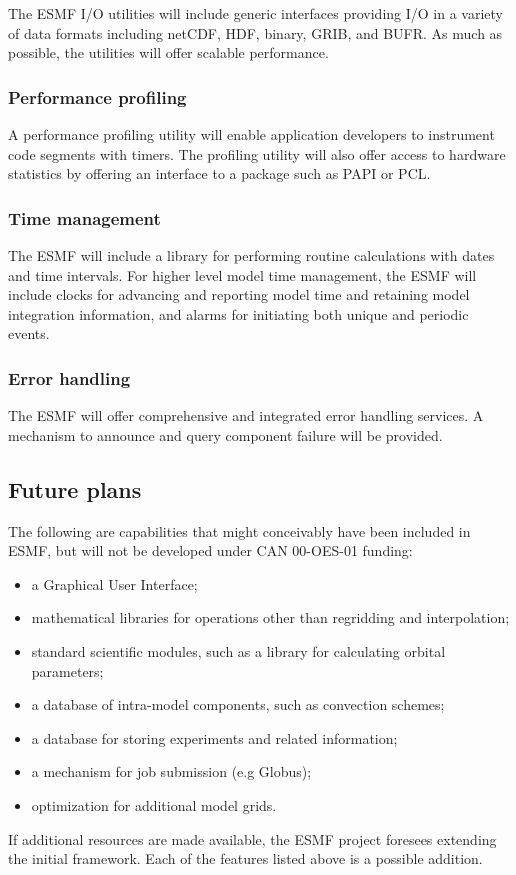 The ESMF I/O utilities will include generic interfaces providing I/O
in a variety of data formats including netCDF, HDF, binary, GRIB, and
BUFR. As much as possible, the utilities will offer scalable
performance.

\subsubsection{Performance profiling}

A performance profiling utility will enable application developers to 
instrument code segments with timers. The profiling utility will also
offer access to hardware statistics by offering an interface to a
package such as PAPI or PCL.

\subsubsection{Time management}

The ESMF will include a library for performing routine 
calculations with dates and time intervals.  For higher level model
time management, the ESMF will include clocks for advancing and 
reporting model time and retaining model integration information, 
and alarms for initiating both unique and periodic events.

\subsubsection{Error handling}

The ESMF will offer comprehensive and integrated error handling
services.  A mechanism to announce and query component failure will be
provided.

\subsection{Future plans}

The following are capabilities that might conceivably have been
included in ESMF, but will not be developed under CAN 00-OES-01
funding:
\begin{itemize}
\item a Graphical User Interface;
\item mathematical libraries for operations other than regridding and
  interpolation;
\item standard scientific modules, such as a library for calculating
  orbital parameters;
\item a database of intra-model components, such as convection schemes;
\item a database for storing experiments and related information;
\item a mechanism for job submission (e.g Globus);
\item optimization for additional model grids.
\end{itemize}

If additional resources are made available, the ESMF project foresees
extending the initial framework.  Each of the features listed above is
a possible addition.




















